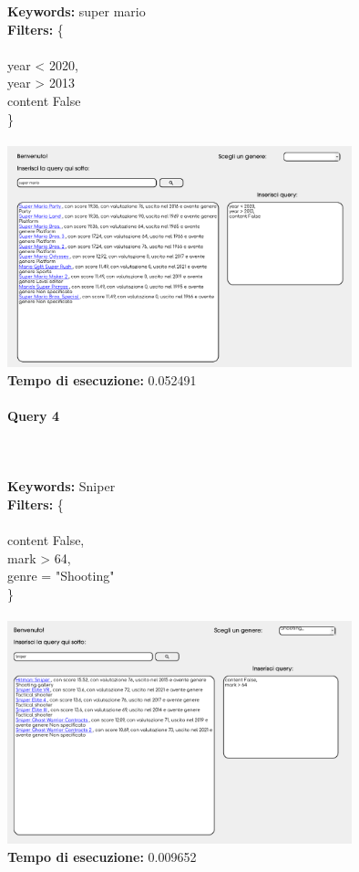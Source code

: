 \documentclass[12pt]{article}
\begin{document}
\noindent \textbf{Keywords: } super mario \\
\textbf{Filters: } \{ \\ \\
\indent year < 2020, \\
\indent year > 2013 \\
\indent content False \\
\} \\\\

\noindent \includegraphics[width=100mm]{Immagini/Image3.png} \\
\textbf{Tempo di esecuzione:} 0.052491 \\
\pagebreak

\paragraph{Query 4} ~ \\ \\

\noindent \textbf{Keywords: } Sniper \\
\textbf{Filters: } \{ \\ \\
\indent content False, \\
\indent mark > 64, \\
\indent genre = "Shooting" \\
\} \\\\

\noindent \includegraphics[width=100mm]{Immagini/Image4.png} \\
\textbf{Tempo di esecuzione:} 0.009652 \\
\pagebreak
\end{document}
